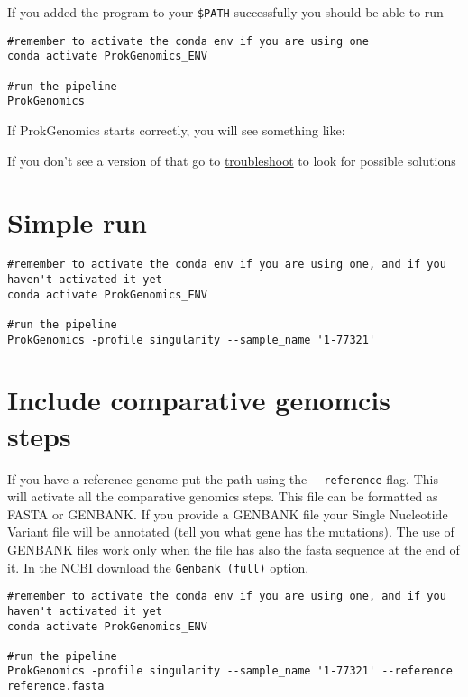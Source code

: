 \documentclass[
]{book}
\begin{document}
If you added the program to your \texttt{\$PATH} successfully you should be able to run

\begin{verbatim}
#remember to activate the conda env if you are using one
conda activate ProkGenomics_ENV

#run the pipeline
ProkGenomics
\end{verbatim}

If ProkGenomics starts correctly, you will see something like:

If you don't see a version of that go to \href{troubleshooting.html}{troubleshoot} to look for possible solutions

\hypertarget{simple-run}{%
\section{Simple run}\label{simple-run}}

\begin{verbatim}
#remember to activate the conda env if you are using one, and if you haven't activated it yet
conda activate ProkGenomics_ENV

#run the pipeline
ProkGenomics -profile singularity --sample_name '1-77321' 
\end{verbatim}

\hypertarget{include-comparative-genomcis-steps}{%
\section{Include comparative genomcis steps}\label{include-comparative-genomcis-steps}}

If you have a reference genome put the path using the \texttt{-\/-reference} flag. This will activate all the comparative genomics steps. This file can be formatted as FASTA or GENBANK. If you provide a GENBANK file your Single Nucleotide Variant file will be annotated (tell you what gene has the mutations). The use of GENBANK files work only when the file has also the fasta sequence at the end of it. In the NCBI download the \texttt{Genbank\ (full)} option.

\begin{verbatim}
#remember to activate the conda env if you are using one, and if you haven't activated it yet
conda activate ProkGenomics_ENV

#run the pipeline
ProkGenomics -profile singularity --sample_name '1-77321' --reference reference.fasta 
\end{verbatim}
\end{document}
